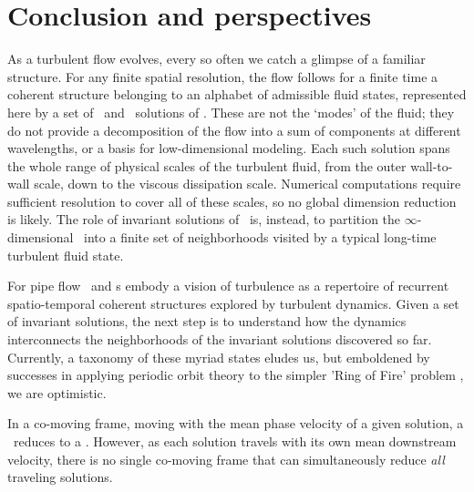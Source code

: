 
\section{Conclusion and perspectives}
\label{s:concl}


As a turbulent flow evolves, every so often we catch a glimpse of a
familiar structure. For any finite spatial resolution, the flow
follows for a finite time a coherent structure belonging to an
alphabet of admissible fluid states, represented here by a set of \reqv\
and \rpo\ solutions of \NS. These are not the `modes' of the fluid; {they
do not provide a decomposition of the flow into a sum of components at
different wavelengths, or a basis for low-dimensional
modeling.} Each such solution spans the whole range of physical scales of
the turbulent fluid, from the outer wall-to-wall scale, down to the
viscous dissipation scale. Numerical computations require sufficient
resolution to cover all of these scales, so no {global} dimension
reduction is likely. The role of invariant solutions of \NS\ is, instead,
to partition the $\infty$-dimensional \statesp\ into a finite set of
neighborhoods visited by a typical long-time turbulent fluid state.

For pipe flow \reqva\ and \rpo s embody a vision of turbulence as a
repertoire of recurrent spatio-temporal coherent structures explored by
turbulent dynamics. Given a set of invariant solutions, the next
step is to understand how the dynamics interconnects the neighborhoods of
the invariant solutions discovered so far.
Currently, a taxonomy of these myriad states eludes us, but emboldened by
successes in applying periodic orbit theory to the simpler 'Ring of Fire' problem
\rf{Christiansen97,lanCvit07,SCD07}, we are optimistic.

In a co-moving frame, moving with the mean phase velocity of a given
solution, a \rpo\ reduces to a \po.
However, as each solution travels with its own mean downstream velocity,
there is no single co-moving frame that can simultaneously reduce
\emph{all} traveling solutions.


